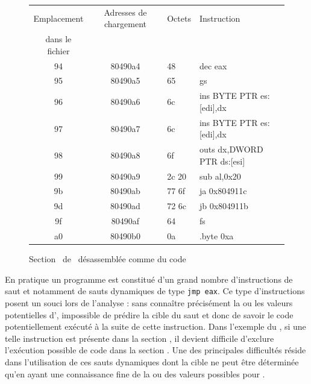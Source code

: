 \begin{figure}
\begin{center}
\begin{tabular}{|c|c|l|l|}
\hline
Emplacement & Adresses de chargement & Octets & Instruction\\ 
dans le fichier & &  & \\ 
\hline
94 & 80490a4 & 48    & dec    eax			\\
95 & 80490a5 & 65    & gs				\\
96 & 80490a6 & 6c    & ins    BYTE PTR es:[edi],dx	\\
97 & 80490a7 & 6c    & ins    BYTE PTR es:[edi],dx	\\
98 & 80490a8 & 6f    & outs   dx,DWORD PTR ds:[esi]	\\
99 & 80490a9 & 2c 20 & sub    al,0x20			\\
9b & 80490ab & 77 6f & ja     0x804911c			\\
9d & 80490ad & 72 6c & jb     0x804911b			\\
9f & 80490af & 64    & fs				\\
a0 & 80490b0 & 0a    & .byte 0xa			\\
\hline
\end{tabular}
\end{center}
\caption{Section \pdata\ de \helloworld\ désassemblée comme du code}
\label{fig:data_exec_helloworld}
\end{figure}

En pratique un programme est constitué d'un grand nombre d'instructions de saut et notamment de sauts dynamiques de type \texttt{jmp eax}.
Ce type d'instructions posent un souci lors de l'analyse : sans connaître précisément la ou les valeurs potentielles d'\eax, impossible de prédire la cible du saut et donc de savoir le code potentiellement exécuté à la suite de cette instruction.
Dans l'exemple du \helloworld, si une telle instruction est présente dans la section \ptext, il devient difficile d'exclure l'exécution possible de code dans la section \pdata.
Une des principales difficultés réside dans l'utilisation de ces sauts dynamiques dont la cible ne peut être déterminée qu'en ayant une connaissance fine de la ou des valeurs possibles pour \eax.

